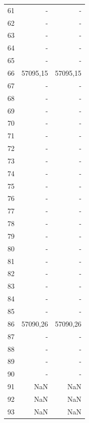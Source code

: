 \begin{appendix}
\begin{table}[h!]
\begin{tabular}{|l|r|r|}
61& -              & -              \\
62& -   & -   \\
63& -              & -              \\
64& -              & -              \\
65& -              & -              \\
66& 57095,15   & 57095,15   \\
67& -              & -              \\
68& -              & -              \\
69& -              & -              \\
70& -              & -              \\
71& -              & -              \\
72& -              & -              \\
73& -              & -              \\
74& -              & -              \\
75& -              & -              \\
76& -              & -              \\
77& -              & -              \\
78& -              & -              \\
79& -              & -              \\
80& -              & -              \\
81& -              & -              \\
82& -              & -              \\
83& -              & -              \\
84& -              & -              \\
85& -              & -              \\
86& 57090,26   & 57090,26   \\
87& -              & -              \\
88& -              & -              \\
89& -              & -              \\
90& -              & -              \\
91& NaN            & NaN            \\
92& NaN            & NaN            \\
93& NaN            & NaN           \\\hline
\end{tabular}
\label{ap:tab2}
\end{table}
\pagebreak


\end{appendix}
